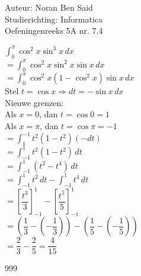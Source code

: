 \documentclass[a4paper]{article}
\begin{document}
  
\noindent \large Auteur: Noran Ben Said \\
\noindent \large Studierichting: Informatica\\
\noindent \large Oefeningenreeks 5A nr. 7.4 \\
\medskip

\normalsize

$ \displaystyle \int_0^{\pi} \cos^2 x \sin^3 x \, dx$\\

$ = \displaystyle \int_0^{\pi} \cos^2 x \sin^2 x \sin x \, dx$\\

$ = \displaystyle \int_0^{\pi} \cos^2 x (1-\cos^2 x)\sin x \, dx$\\

Stel $ t = \cos x \Rightarrow dt = -\sin x \, dx$\\

Nieuwe grenzen:\\

Als $x=0$, dan $t=\cos 0=1$\\

Als $x=\pi$, dan $t=\cos \pi=-1$\\

$ = \displaystyle \int_1^{-1} t^2(1-t^2)(-dt)$\\

$ = \displaystyle \int_{-1}^{1} t^2(1-t^2)\,dt$\\

$ = \displaystyle \int_{-1}^{1} (t^2-t^4)\,dt$\\

$ = \displaystyle \int_{-1}^{1} t^2\,dt - \int_{-1}^{1} t^4\,dt$\\

$ = \left[\dfrac{t^3}{3}\right]_{-1}^{1} - \left[\dfrac{t^5}{5}\right]_{-1}^{1}$\\

$ = \left(\dfrac{1}{3}-\left(-\dfrac{1}{3}\right)\right) - \left(\dfrac{1}{5}-\left(-\dfrac{1}{5}\right)\right)$\\

$ = \dfrac{2}{3} - \dfrac{2}{5} = \dfrac{4}{15}$\\


\begin{thebibliography}{999}
\end{thebibliography}
\end{document}
